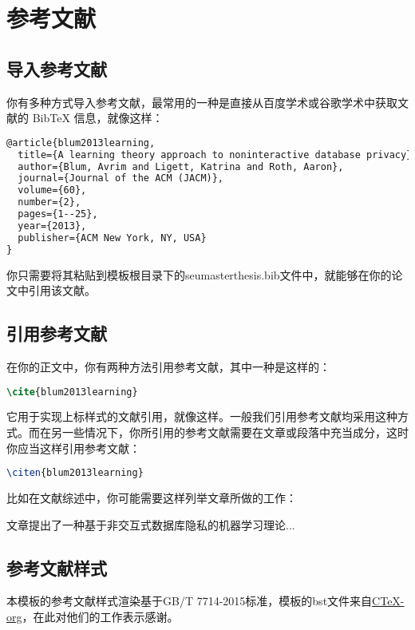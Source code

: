 \chapter{参考文献}
\label{chp:bib}

\section{导入参考文献}

你有多种方式导入参考文献，最常用的一种是直接从百度学术或谷歌学术中获取文献的 BibTeX 信息，就像这样：

\begin{tcolorbox}
\begin{lstlisting}[language=TeX]
@article{blum2013learning,
  title={A learning theory approach to noninteractive database privacy},
  author={Blum, Avrim and Ligett, Katrina and Roth, Aaron},
  journal={Journal of the ACM (JACM)},
  volume={60},
  number={2},
  pages={1--25},
  year={2013},
  publisher={ACM New York, NY, USA}
}
\end{lstlisting}
\end{tcolorbox}

你只需要将其粘贴到模板根目录下的seumasterthesis.bib文件中，就能够在你的论文中引用该文献。

\section{引用参考文献}

在你的正文中，你有两种方法引用参考文献，其中一种是这样的：

\begin{tcolorbox}
\begin{lstlisting}[language=TeX]
\cite{blum2013learning}
\end{lstlisting}
\end{tcolorbox}

\noindent 它用于实现上标样式的文献引用，就像这样\cite{blum2013learning}。一般我们引用参考文献均采用这种方式。而在另一些情况下，你所引用的参考文献需要在文章或段落中充当成分，这时你应当这样引用参考文献：

\begin{tcolorbox}
\begin{lstlisting}[language=TeX]
\citen{blum2013learning}
\end{lstlisting}
\end{tcolorbox}

\noindent 比如在文献综述中，你可能需要这样列举文章所做的工作：

文章提出了一种基于非交互式数据库隐私的机器学习理论...

\section{参考文献样式}

本模板的参考文献样式渲染基于GB/T 7714-2015标准，模板的bst文件来自\href{https://github.com/CTeX-org/gbt7714-bibtex-style}{CTeX-org}，在此对他们的工作表示感谢。
